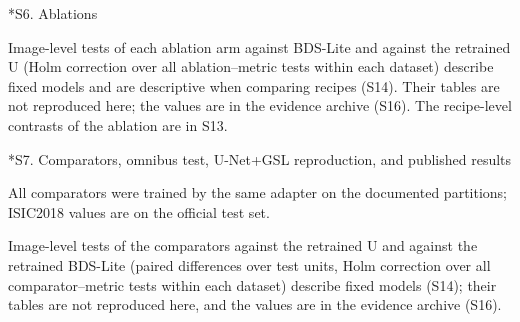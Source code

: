 \documentclass[10pt]{article}
\makeatletter
\renewcommand\section{\@startsection{section}{1}{\z@}{-2.4ex \@plus -1ex \@minus -.2ex}{1.2ex \@plus .2ex}{\normalfont\large\bfseries}}
\newcommand{\fitwidth}[1]{\sbox{\fitbox}{#1}\ifdim\wd\fitbox>\linewidth\resizebox{\linewidth}{!}{\usebox{\fitbox}}\else\usebox{\fitbox}\fi}
\makeatother
\begin{document}
\section*{S6. Ablations}
\begin{table}[!htbp]\centering
\fitwidth{}
\caption{Three-seed means $\pm$ seed SD of the ablation arms other than D+S. ACDC values of D use the corrected unweighted runs (S13).}
\end{table}
Image-level tests of each ablation arm against BDS-Lite and against the retrained U (Holm correction over all ablation--metric tests within each dataset) describe fixed models and are descriptive when comparing recipes (S14). Their tables are not reproduced here; the values are in the evidence archive (S16). The recipe-level contrasts of the ablation are in S13.


\section*{S7. Comparators, omnibus test, U-Net+GSL reproduction, and published results}

\begin{table}[!htbp]
\centering
\fitwidth{}
\caption{\label{tab:s-arms}Study 1: all arms relative to U, seeds 1--3: seed-averaged paired differences over test units (positive favors the arm; HD95 in pixels with the sign reversed). $^{\dagger}$The difference of run means exceeds the run-level margin, the 95\% half-width for a difference of two three-run means (added post hoc). The ACDC and Synapse runs of U are low references (S5). The individual runs are shown in S5; image-level tests of these models are in the evidence archive (S16).}
\end{table}

All comparators were trained by the same adapter on the documented partitions; ISIC2018 values are on the official test set.
\begin{table}[!htbp]\centering
\fitwidth{}
\caption{Comparator and retrained-reference absolute means (seeds 1--3; mean $\pm$ sample SD of per-run image/slice class-macro scores, excluding classes absent in both masks). This is the aggregation used in Table~4 of the main text. Run-level contrasts separately use patient/case means and common defined test units; differences of these descriptive means need not equal those contrasts.}
\end{table}
Image-level tests of the comparators against the retrained U and against the retrained BDS-Lite (paired differences over test units, Holm correction over all comparator--metric tests within each dataset) describe fixed models (S14); their tables are not reproduced here, and the values are in the evidence archive (S16).
\end{document}
